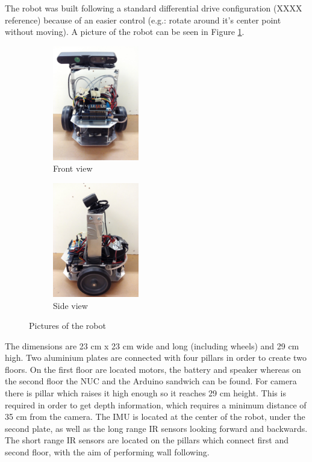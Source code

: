 The robot was built following a standard differential drive configuration (XXXX reference) because of an easier control (e.g.: rotate around it's center point without moving). A picture of the robot can be seen in Figure \ref{fig:robotPic}.

\begin{figure}[h]
        \centering
        \begin{subfigure}[b]{0.45\linewidth}
        \centering
                \includegraphics[height=5cm]{figures/front.jpg}
		\caption{Front view}
        \end{subfigure}
        \begin{subfigure}[b]{0.45\linewidth}
        \centering
                \includegraphics[height=5cm]{figures/side.jpg}
                \caption{Side view}
        \end{subfigure}
        \caption{Pictures of the robot}
                \label{fig:robotPic}
\end{figure}


The dimensions are 23 cm x 23 cm wide and long (including wheels) and 29 cm high. Two aluminium plates are connected with four pillars in order to create two floors. On the first floor are located motors, the battery and speaker whereas on the second floor the NUC and the Arduino sandwich can be found. For camera there is pillar which raises it high enough so it reaches 29 cm height. This is required in order to get depth information, which requires a minimum distance of 35 cm from the camera. The IMU is located at the center of the robot, under the second plate, as well as the long range IR sensors looking forward and backwards. The short range IR sensors are located on the pillars which connect first and second floor, with the aim of performing wall following. 